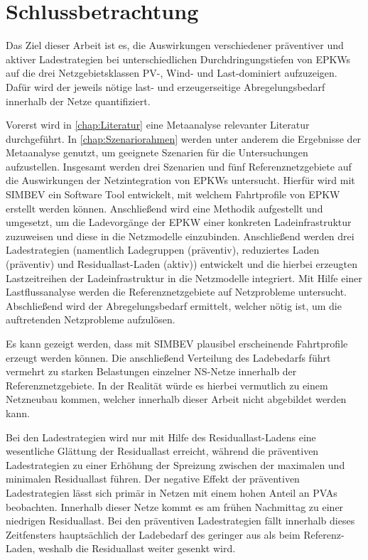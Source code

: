 \section{Schlussbetrachtung}\label{chap:schlussbetrachtung}

Das Ziel dieser Arbeit ist es, die Auswirkungen verschiedener präventiver und aktiver Ladestrategien bei unterschiedlichen Durchdringungstiefen von \glspl{EPKW} auf die drei Netzgebietsklassen \gls{PV}-, Wind- und Last-dominiert aufzuzeigen.
Dafür wird der jeweils nötige last- und erzeugerseitige Abregelungsbedarf innerhalb der Netze quantifiziert.\medskip

Vorerst wird in \autoref{chap:Literatur} eine Metaanalyse relevanter Literatur durchgeführt.
In \autoref{chap:Szenariorahmen} werden unter anderem die Ergebnisse der Metaanalyse genutzt, um geeignete Szenarien für die Untersuchungen aufzustellen.
Insgesamt werden drei Szenarien und fünf Referenznetzgebiete auf die Auswirkungen der Netzintegration von \glspl{EPKW} untersucht.
Hierfür wird mit \gls{SIMBEV} ein Software Tool entwickelt, mit welchem Fahrtprofile von \gls{EPKW} erstellt werden können.
Anschließend wird eine Methodik aufgestellt und umgesetzt, um die Ladevorgänge der \gls{EPKW} einer konkreten Ladeinfrastruktur zuzuweisen und diese in die Netzmodelle einzubinden.
Anschließend werden drei Ladestrategien (namentlich Ladegruppen (präventiv), reduziertes Laden (präventiv) und Residuallast-Laden (aktiv)) entwickelt und die hierbei erzeugten Lastzeitreihen der Ladeinfrastruktur in die Netzmodelle integriert.
Mit Hilfe einer Lastflussanalyse werden die Referenznetzgebiete auf Netzprobleme untersucht.
Abschließend wird der Abregelungsbedarf ermittelt, welcher nötig ist, um die auftretenden Netzprobleme aufzulösen.\medskip

Es kann gezeigt werden, dass mit \gls{SIMBEV} plausibel erscheinende Fahrtprofile erzeugt werden können.
Die anschließend Verteilung des Ladebedarfs führt vermehrt zu starken Belastungen einzelner \gls{NS}-Netze innerhalb der Referenznetzgebiete.
In der Realität würde es hierbei vermutlich zu einem Netzneubau kommen, welcher innerhalb dieser Arbeit nicht abgebildet werden kann.\medskip

Bei den Ladestrategien wird nur mit Hilfe des Residuallast-Ladens eine wesentliche Glättung der Residuallast erreicht, während die präventiven Ladestrategien zu einer Erhöhung der Spreizung zwischen der maximalen und minimalen Residuallast führen.
Der negative Effekt der präventiven Ladestrategien lässt sich primär in Netzen mit einem hohen Anteil an \glspl{PVA} beobachten.
Innerhalb dieser Netze kommt es am frühen Nachmittag zu einer niedrigen Residuallast.
Bei den präventiven Ladestrategien fällt innerhalb dieses Zeitfensters hauptsächlich der Ladebedarf des \UCs \zH geringer aus als beim Referenz-Laden, weshalb die Residuallast weiter gesenkt wird.\medskip

